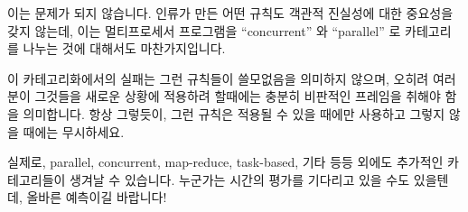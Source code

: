 이는 문제가 되지 않습니다.
인류가 만든 어떤 규칙도 객관적 진실성에 대한 중요성을 갖지 않는데, 이는
멀티프로세서 프로그램을 ``concurrent'' 와 ``parallel'' 로 카테고리를 나누는
것에 대해서도 마찬가지입니다.

이 카테고리화에서의 실패는 그런 규칙들이 쓸모없음을 의미하지 않으며, 오히려
여러분이 그것들을 새로운 상황에 적용하려 할때에는 충분히 비판적인 프레임을
취해야 함을 의미합니다.
항상 그렇듯이, 그런 규칙은 적용될 수 있을 때에만 사용하고 그렇지 않을 때에는
무시하세요.

실제로, parallel, concurrent, map-reduce, task-based, 기타 등등 외에도 추가적인
카테고리들이 생겨날 수 있습니다.
누군가는 시간의 평가를 기다리고 있을 수도 있을텐데, 올바른 예측이길 바랍니다!
\iffalse

Which is just fine.
No rule that humankind writes carries any weight against objective
reality, including the rule dividing multiprocessor programs into
categories such as ``concurrent'' and ``parallel''.

This categorization failure does not mean such rules are useless,
but rather that you should take on a suitably skeptical frame of mind when
attempting to apply them to new situations.
As always, use such rules where they apply and ignore them otherwise.

In fact, it is likely that new categories will arise in addition
to parallel, concurrent, map-reduce, task-based, and so on.
Some will stand the test of time, but good luck guessing which!
\fi
